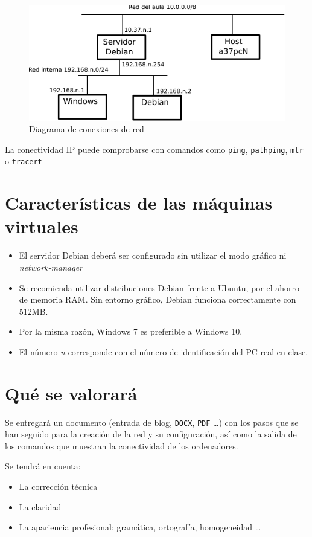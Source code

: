 \begin{figure}[h]
  \center\includegraphics{media/practica-red-ip.pdf}
  \caption{Diagrama de conexiones de red}
  \label{fig:redesip}
\end{figure}

La conectividad IP puede comprobarse con comandos como \texttt{ping}, \texttt{pathping}, \texttt{mtr} o \texttt{tracert}


\section{Características de las máquinas virtuales}
\begin{itemize}
\item El servidor Debian deberá ser configurado sin utilizar el modo gráfico ni \textit{network-manager}
\item Se recomienda utilizar distribuciones Debian frente a Ubuntu, por el ahorro de memoria RAM. Sin entorno gráfico, Debian funciona correctamente con 512MB.
\item Por la misma razón, Windows 7 es preferible a Windows 10.
  
\item El número \textit{n} corresponde con el número de identificación del PC real en clase.
\end{itemize}

\section{Qué se valorará}
Se entregará un documento (entrada de blog, \texttt{DOCX}, \texttt{PDF} \ldots) con los pasos que se han seguido para la creación de la red y su configuración, así como la salida de los comandos que muestran la conectividad de los ordenadores.

Se tendrá en cuenta:
\begin{itemize}
\item La corrección técnica
\item La claridad
\item La apariencia profesional: gramática, ortografía, homogeneidad \ldots
\end{itemize}


